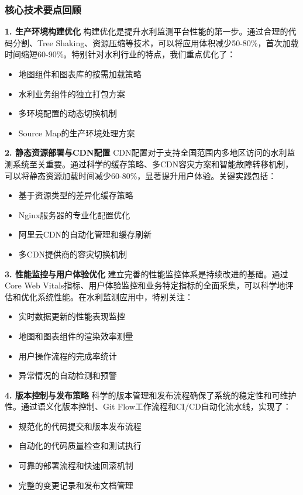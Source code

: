 \subsubsection{核心技术要点回顾}\label{ux6838ux5fc3ux6280ux672fux8981ux70b9ux56deux987e} \textbf{1. 生产环境构建优化}
构建优化是提升水利监测平台性能的第一步。通过合理的代码分割、Tree Shaking、资源压缩等技术，可以将应用体积减少50-80\%，首次加载时间缩短60-90\%。特别针对水利行业的特点，我们重点优化了： \begin{itemize}
\tightlist \item 地图组件和图表库的按需加载策略 \item 水利业务组件的独立打包方案 \item 多环境配置的动态切换机制 \item Source Map的生产环境处理方案 \end{itemize}
\textbf{2. 静态资源部署与CDN配置}
CDN配置对于支持全国范围内多地区访问的水利监测系统至关重要。通过科学的缓存策略、多CDN容灾方案和智能故障转移机制，可以将静态资源加载时间减少60-80\%，显著提升用户体验。关键实践包括： \begin{itemize}
\tightlist \item 基于资源类型的差异化缓存策略 \item Nginx服务器的专业化配置优化 \item 阿里云CDN的自动化管理和缓存刷新 \item 多CDN提供商的容灾切换机制 \end{itemize}
\textbf{3. 性能监控与用户体验优化} 建立完善的性能监控体系是持续改进的基础。通过Core Web Vitals指标、用户体验监控和业务特定指标的全面采集，可以科学地评估和优化系统性能。在水利监测应用中，特别关注：
\begin{itemize} \tightlist \item 实时数据更新的性能表现监控 \item 地图和图表组件的渲染效率测量 \item 用户操作流程的完成率统计 \item 异常情况的自动检测和预警 \end{itemize}
\textbf{4. 版本控制与发布策略} 科学的版本管理和发布流程确保了系统的稳定性和可维护性。通过语义化版本控制、Git Flow工作流程和CI/CD自动化流水线，实现了： \begin{itemize} \tightlist
\item 规范化的代码提交和版本发布流程 \item 自动化的代码质量检查和测试执行 \item 可靠的部署流程和快速回滚机制 \item 完整的变更记录和发布文档管理 \end{itemize}
